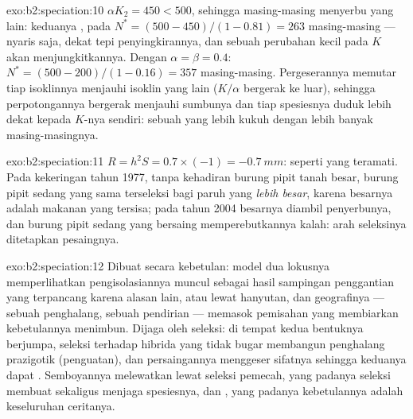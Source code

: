 \begin{solution}{exo:b2:speciation:10}
$\alpha K_2 = 450 < 500$, sehingga masing-masing menyerbu yang lain:
keduanya , pada $N^{*} = (500 - 450)/(1 - 0.81) = 263$ masing-masing --- nyaris saja, dekat tepi penyingkirannya, dan
sebuah perubahan kecil pada $K$ akan menjungkitkannya. Dengan $\alpha = \beta = 0.4$: $N^{*} = (500 - 200)/(1 - 0.16) = 357$ masing-masing.
Pergeserannya memutar tiap isoklinnya menjauhi isoklin yang lain
($K/\alpha$ bergerak ke luar), sehingga perpotongannya bergerak menjauhi
sumbunya dan tiap spesiesnya duduk lebih dekat kepada $K$-nya sendiri:
sebuah  yang lebih kukuh dengan lebih banyak
masing-masingnya.
\end{solution}

\begin{solution}{exo:b2:speciation:11}
$R = h^{2}S = 0.7\times(-1) = \qty{-0.7}{mm}$: seperti yang teramati.
Pada kekeringan tahun 1977, tanpa kehadiran burung pipit tanah besar,
burung pipit sedang yang sama terseleksi bagi paruh yang \emph{lebih
besar}, karena  besarnya adalah makanan yang tersisa; pada tahun
2004  besarnya diambil penyerbunya, dan burung pipit sedang yang
bersaing memperebutkannya kalah: arah seleksinya ditetapkan pesaingnya.
\end{solution}

\begin{solution}{exo:b2:speciation:12}
Dibuat secara kebetulan: model dua lokusnya memperlihatkan
pengisolasiannya muncul sebagai hasil sampingan penggantian yang
terpancang karena alasan lain, atau lewat hanyutan, dan geografinya ---
sebuah penghalang, sebuah pendirian --- memasok pemisahan yang
membiarkan kebetulannya menimbun. Dijaga oleh seleksi: di tempat kedua
bentuknya berjumpa, seleksi terhadap hibrida yang tidak bugar membangun
penghalang prazigotik (penguatan), dan persaingannya menggeser sifatnya
sehingga keduanya dapat . Semboyannya melewatkan
 lewat seleksi pemecah, yang padanya seleksi membuat
sekaligus menjaga spesiesnya, dan , yang padanya kebetulannya
adalah keseluruhan ceritanya.
\end{solution}


